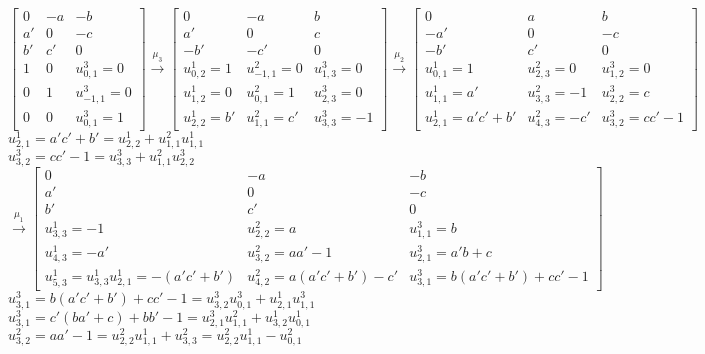 \documentclass{amsart}
\numberwithin{theorem}{section}
\begin{document}
  \[
    \left[\begin{array}{ccc} 0 & -a & -b\\ a' & 0 & -c\\ b' & c' & 0\\ 1 & 0 & u_{0,1}^3=0\\ 0 & 1 & u_{-1,1}^3=0\\ 0 & 0 & u_{0,1}^3=1\end{array}\right]
      \stackrel{\mu_3}{\longrightarrow}\left[\begin{array}{ccc} 0 & -a & b\\ a' & 0 & c\\ -b' & -c' & 0\\ u_{0,2}^1=1 & u_{-1,1}^2=0 & u_{1,3}^3=0\\ u_{1,2}^1=0 & u_{0,1}^2=1 & u_{2,3}^3=0\\ u_{2,2}^1=b' & u_{1,1}^2 = c' & u_{3,3}^3 = -1\end{array}\right]
        \stackrel{\mu_2}{\longrightarrow}\left[\begin{array}{ccc} 0 & a & b\\ -a' & 0 & -c\\ -b' & c' & 0\\ u_{0,1}^1=1 & u_{2,3}^2=0 & u_{1,2}^3=0\\ u_{1,1}^1=a' & u_{3,3}^2=-1 & u_{2,2}^3=c\\ u_{2,1}^1=a'c'+b' & u_{4,3}^2 = -c' & u_{3,2}^3=cc'-1\end{array}\right]
  \]
  $u_{2,1}^1 = a'c'+b' = u_{2,2}^1 + u_{1,1}^2 u_{1,1}^1$\\
  $u_{3,2}^3 = cc'-1 = u_{3,3}^3 + u_{1,1}^2 u_{2,2}^3$\\
  \[
    \stackrel{\mu_1}{\longrightarrow}\left[\begin{array}{ccc} 0 & -a & -b\\ a' & 0 & -c\\ b' & c' & 0\\ u_{3,3}^1=-1 & u_{2,2}^2=a & u_{1,1}^3 = b\\ u_{4,3}^1=-a' & u_{3,2}^2=aa'-1 & u_{2,1}^3 = a'b+c\\ u_{5,3}^1 = u_{3,3}^1 u_{2,1}^1 = -(a'c'+b') & u_{4,2}^2=a(a'c'+b')-c' & u_{3,1}^3=b(a'c'+b')+cc'-1\end{array}\right]
  \]
  $u_{3,1}^3 = b(a'c'+b')+cc'-1 = u_{3,2}^3 u_{0,1}^3 + u_{2,1}^1 u_{1,1}^3$\\
  $u_{3,1}^3 = c'(ba'+c)+bb'-1 = u_{2,1}^3 u_{1,1}^2 + u_{3,2}^1 u_{0,1}^1$\\
  $u_{3,2}^2 = aa'-1 = u_{2,2}^2 u_{1,1}^1 + u_{3,3}^2 = u_{2,2}^2 u_{1,1}^1 - u_{0,1}^2$\\
\end{document}
